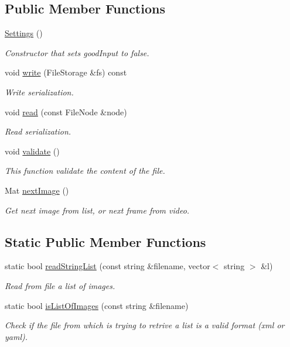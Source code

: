 \subsection*{Public Member Functions}
\begin{DoxyCompactItemize}
\item 
\mbox{\hyperlink{class_settings_ab7169a6eefce79566dd07db3b1e5e967}{Settings}} ()
\begin{DoxyCompactList}\small\item\em Constructor that sets {\ttfamily good\+Input} to false. \end{DoxyCompactList}\item 
void \mbox{\hyperlink{class_settings_a0785cc2055091b2a857b1dcefe291acc}{write}} (File\+Storage \&fs) const
\begin{DoxyCompactList}\small\item\em Write serialization. \end{DoxyCompactList}\item 
void \mbox{\hyperlink{class_settings_a2d7841f8441095032e0f3b7d20adfd3f}{read}} (const File\+Node \&node)
\begin{DoxyCompactList}\small\item\em Read serialization. \end{DoxyCompactList}\item 
void \mbox{\hyperlink{class_settings_a29016205c90b95d6247df18365a70dd0}{validate}} ()
\begin{DoxyCompactList}\small\item\em This function validate the content of the file. \end{DoxyCompactList}\item 
Mat \mbox{\hyperlink{class_settings_a7701462e928f2425b342440fba9973e5}{next\+Image}} ()
\begin{DoxyCompactList}\small\item\em Get next image from list, or next frame from video. \end{DoxyCompactList}\end{DoxyCompactItemize}
\subsection*{Static Public Member Functions}
\begin{DoxyCompactItemize}
\item 
static bool \mbox{\hyperlink{class_settings_ab5f7cb92b11b6d324d9994ebcc2efa3f}{read\+String\+List}} (const string \&filename, vector$<$ string $>$ \&l)
\begin{DoxyCompactList}\small\item\em Read from file a list of images. \end{DoxyCompactList}\item 
static bool \mbox{\hyperlink{class_settings_af5003738fba7def4d4d9850a08eecacb}{is\+List\+Of\+Images}} (const string \&filename)
\begin{DoxyCompactList}\small\item\em Check if the file from which is trying to retrive a list is a valid format (xml or yaml). \end{DoxyCompactList}\end{DoxyCompactItemize}
